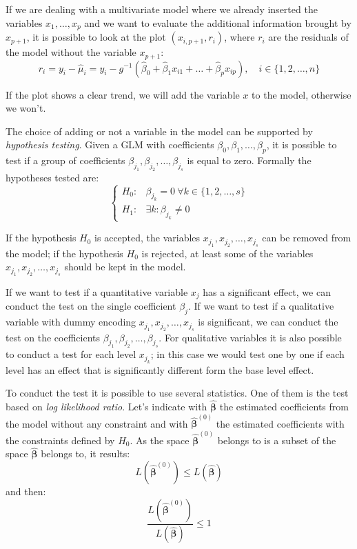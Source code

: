 \documentclass[a4paper, nobind]{templates/ociamthesis}
\theoremstyle{definition}
\theoremstyle{definition}
\theoremstyle{definition}
\theoremstyle{remark}
\begin{document}
If we are dealing with a multivariate model where we already inserted the variables \(x_1, \dots, x_p\) and we want to evaluate the additional information brought by \(x_{p+1}\), it is possible to look at the plot \((x_{i, p+1}, r_i)\), where \(r_i\) are the residuals of the model without the variable \(x_{p+1}\):
\[
r_i = y_i - \hat{\mu}_i = y_i - g^{-1}\left( \hat{\beta}_0 + \hat{\beta}_1 x_{i1} + \dots + \hat{\beta}_p x_{ip} \right), \quad i\in\{1,2,\dots,n\}
\]

If the plot shows a clear trend, we will add the variable \(x\) to the model, otherwise we won't.

The choice of adding or not a variable in the model can be supported by \emph{hypothesis testing}. Given a GLM with coefficients \(\beta_0, \beta_1, \dots, \beta_p\), it is possible to test if a group of coefficients \(\beta_{j_1}, \beta_{j_2}, \dots, \beta_{j_s}\) is equal to zero. Formally the hypotheses tested are:
\[
\begin{cases}
H_0: & \beta_{j_k} = 0 \ \forall k \in \{1, 2, \dots, s\} \\
H_1: & \exists k: \beta_{j_k} \neq 0
\end{cases}
\]

If the hypothesis \(H_0\) is accepted, the variables \(x_{j_1}, x_{j_2}, \dots, x_{j_s}\) can be removed from the model; if the hypothesis \(H_0\) is rejected, at least some of the variables \(x_{j_1}, x_{j_2}, \dots, x_{j_s}\) should be kept in the model.

If we want to test if a quantitative variable \(x_j\) has a significant effect, we can conduct the test on the single coefficient \(\beta_j\). If we want to test if a qualitative variable with dummy encoding \(x_{j_1}, x_{j_2}, \dots, x_{j_s}\) is significant, we can conduct the test on the coefficients \(\beta_{j_1}, \beta_{j_2}, \dots, \beta_{j_s}\). For qualitative variables it is also possible to conduct a test for each level \(x_{j_k}\); in this case we would test one by one if each level has an effect that is significantly different form the base level effect.

To conduct the test it is possible to use several statistics. One of them is the test based on \emph{log likelihood ratio}. Let's indicate with \(\hat{\boldsymbol{\beta}}\) the estimated coefficients from the model without any constraint and with \(\hat{\boldsymbol{\beta}}^{(0)}\) the estimated coefficients with the constraints defined by \(H_0\). As the space \(\hat{\boldsymbol{\beta}}^{(0)}\) belongs to is a subset of the space \(\hat{\boldsymbol{\beta}}\) belongs to, it results:
\[
L\left(\hat{\boldsymbol{\beta}}^{(0)}\right) \le L\left(\hat{\boldsymbol{\beta}}\right)
\]
and then:
\[
\frac{L\left(\hat{\boldsymbol{\beta}}^{(0)}\right)}{L\left(\hat{\boldsymbol{\beta}}\right)} \le 1
\]
\end{document}
